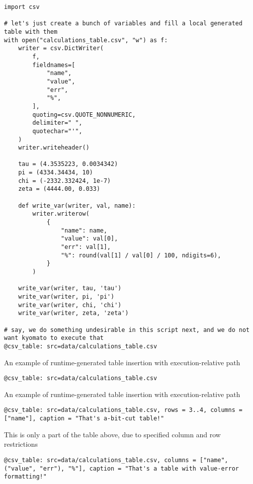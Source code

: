 \documentclass[a4paper]{article}
\begin{document}
\begin{verbatim}
import csv

# let's just create a bunch of variables and fill a local generated table with them
with open("calculations_table.csv", "w") as f:
    writer = csv.DictWriter(
        f,
        fieldnames=[
            "name",
            "value",
            "err",
            "%",
        ],
        quoting=csv.QUOTE_NONNUMERIC,
        delimiter=" ",
        quotechar="'",
    )
    writer.writeheader()

    tau = (4.3535223, 0.0034342)
    pi = (4334.34434, 10)
    chi = (-2332.332424, 1e-7)
    zeta = (4444.00, 0.033)

    def write_var(writer, val, name):
        writer.writerow(
            {
                "name": name,
                "value": val[0],
                "err": val[1],
                "%": round(val[1] / val[0] / 100, ndigits=6),
            }
        )

    write_var(writer, tau, 'tau')
    write_var(writer, pi, 'pi')
    write_var(writer, chi, 'chi')
    write_var(writer, zeta, 'zeta')

# say, we do something undesirable in this script next, and we do not want kyomato to execute that
@csv_table: src=data/calculations_table.csv
\end{verbatim}

An example of runtime-generated table insertion with execution-relative path \\

\begin{verbatim}
@csv_table: src=data/calculations_table.csv
\end{verbatim}

An example of runtime-generated table insertion with execution-relative path \\

\begin{verbatim}
@csv_table: src=data/calculations_table.csv, rows = 3..4, columns = ["name"], caption = "That's a-bit-cut table!"
\end{verbatim}

This is only a part of the table above, due to specified column and row restrictions \\

\begin{verbatim}
@csv_table: src=data/calculations_table.csv, columns = ["name", ("value", "err"), "%"], caption = "That's a table with value-error formatting!"
\end{verbatim}
\end{document}
